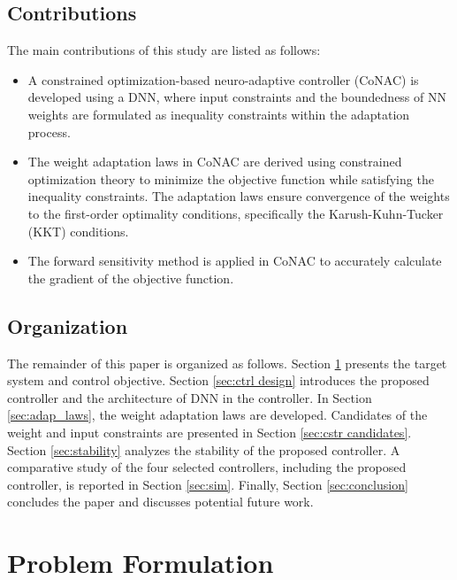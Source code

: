\documentclass[lettersize,journal]{IEEEtran}
\begin{document}
\subsection{Contributions}

The main contributions of this study are listed as follows:
\begin{itemize}
    \item A constrained optimization-based neuro-adaptive controller (CoNAC) is developed using a DNN, where input constraints and the boundedness of NN weights are formulated as inequality constraints within the adaptation process.
    \item The weight adaptation laws in CoNAC are derived using constrained optimization theory to minimize the objective function while satisfying the inequality constraints. The adaptation laws ensure convergence of the weights to the first-order optimality conditions, specifically the Karush-Kuhn-Tucker (KKT) conditions.
    \item The forward sensitivity method is applied in CoNAC to accurately calculate the gradient of the objective function.
\end{itemize}

\subsection{Organization}

The remainder of this paper is organized as follows. 
Section \ref{sec: Problem Formulation} presents the target system and control objective.
Section \ref{sec:ctrl design} introduces the proposed controller and the architecture of DNN in the controller. 
In Section \ref{sec:adap_laws}, the weight adaptation laws are developed.
Candidates of the weight and input constraints are presented in Section \ref{sec:cstr candidates}.
Section \ref{sec:stability} analyzes the stability of the proposed controller.
A comparative study of the four selected controllers, including the proposed controller, is reported in Section \ref{sec:sim}.
Finally, Section \ref{sec:conclusion} concludes the paper and discusses potential future work.

\section{Problem Formulation}\label{sec: Problem Formulation}
\end{document}
